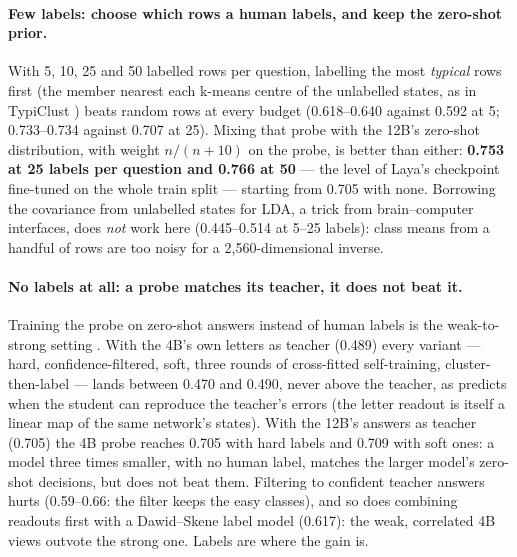 \documentclass[11pt,a4paper]{article}
\begin{document}
\paragraph{Few labels: choose which rows a human labels, and keep the zero-shot prior.} With 5, 10, 25 and 50 labelled rows per question, labelling the most \emph{typical} rows first (the member nearest each k-means centre of the unlabelled states, as in TypiClust \cite{typiclust}) beats random rows at every budget (0.618--0.640 against 0.592 at 5; 0.733--0.734 against 0.707 at 25). Mixing that probe with the 12B's zero-shot distribution, with weight $n/(n+10)$ on the probe, is better than either: \textbf{0.753 at 25 labels per question and 0.766 at 50} --- the level of Laya's checkpoint fine-tuned on the whole train split --- starting from 0.705 with none. Borrowing the covariance from unlabelled states for LDA, a trick from brain--computer interfaces, does \emph{not} work here (0.445--0.514 at 5--25 labels): class means from a handful of rows are too noisy for a 2,560-dimensional inverse.

\paragraph{No labels at all: a probe matches its teacher, it does not beat it.} Training the probe on zero-shot answers instead of human labels is the weak-to-strong setting \cite{w2s}. With the 4B's own letters as teacher (0.489) every variant --- hard, confidence-filtered, soft, three rounds of cross-fitted self-training, cluster-then-label --- lands between 0.470 and 0.490, never above the teacher, as \cite{w2s} predicts when the student can reproduce the teacher's errors (the letter readout is itself a linear map of the same network's states). With the 12B's answers as teacher (0.705) the 4B probe reaches 0.705 with hard labels and 0.709 with soft ones: a model three times smaller, with no human label, matches the larger model's zero-shot decisions, but does not beat them. Filtering to confident teacher answers hurts (0.59--0.66: the filter keeps the easy classes), and so does combining readouts first with a Dawid--Skene label model (0.617): the weak, correlated 4B views outvote the strong one. Labels are where the gain is.
\end{document}
